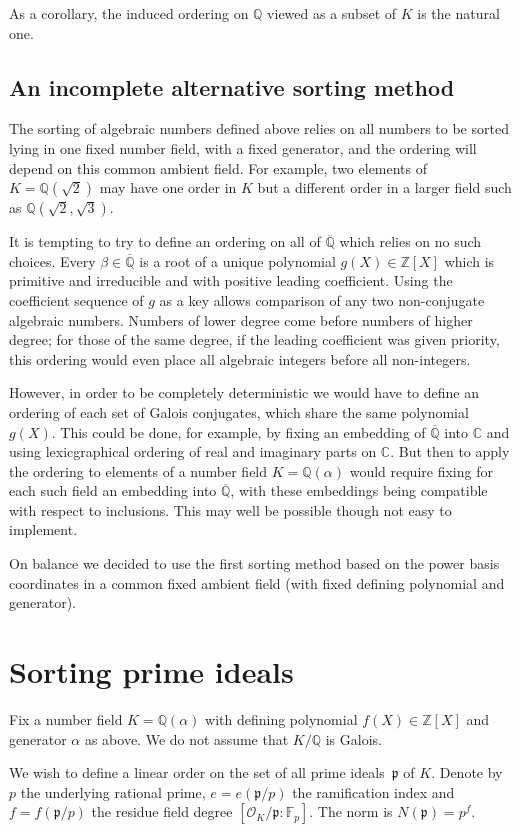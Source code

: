 \documentclass{article}
\def\Z{{\mathbb Z}}
\def\Q{{\mathbb Q}}
\def\C{{\mathbb C}}
\def\F{{\mathbb F}}
\def\OO{{\mathcal O}}
\def\p{{\mathfrak p}}
\def\Qbar{\overline{\Q}}
\begin{document}
As a corollary, the induced ordering on $\Q$ viewed as a subset of $K$
is the natural one.

\subsection{An incomplete alternative sorting method}

The sorting of algebraic numbers defined above relies on all numbers
to be sorted lying in one fixed number field, with a fixed generator,
and the ordering will depend on this common ambient field.  For
example, two elements of $K=\Q(\sqrt{2})$ may have one order in $K$
but a different order in a larger field such as
$\Q(\sqrt{2},\sqrt{3})$.

It is tempting to try to define an ordering on all of $\Qbar$ which
relies on no such choices.  Every $\beta\in\Qbar$ is a root of a
unique polynomial $g(X)\in\Z[X]$ which is primitive and irreducible
and with positive leading coefficient.  Using the coefficient sequence
of $g$ as a key allows comparison of any two non-conjugate algebraic
numbers.  Numbers of lower degree come before numbers of higher
degree; for those of the same degree, if the leading coefficient was
given priority, this ordering would even place all algebraic integers
before all non-integers.

However, in order to be completely deterministic we would have to
define an ordering of each set of Galois conjugates, which share the
same polynomial $g(X)$.  This could be done, for example, by fixing an
embedding of $\Qbar$ into $\C$ and using lexicgraphical ordering of
real and imaginary parts on $\C$.  But then to apply the ordering to
elements of a number field $K=\Q(\alpha)$ would require fixing for
each such field an embedding into $\Qbar$, with these embeddings being
compatible with respect to inclusions.  This may well be possible
though not easy to implement.

On balance we decided to use the first sorting method based on the
power basis coordinates in a common fixed ambient field (with fixed
defining polynomial and generator).

\section{Sorting prime ideals}
Fix a number field $K=\Q(\alpha)$ with defining polynomial
$f(X)\in\Z[X]$ and generator $\alpha$ as above.  We do not assume that
$K/\Q$ is Galois.

We wish to define a linear order on the set of all prime ideals~$\p$
of $K$.  Denote by $p$ the underlying rational prime, $e=e(\p/p)$ the
ramification index and $f=f(\p/p)$ the residue field degree
$[\OO_K/\p:\F_p]$.  The norm is $N(\p)=p^f$.
\end{document}
